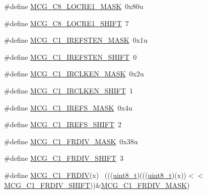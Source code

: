 \begin{DoxyCompactItemize}
\item 
\#define \hyperlink{group___m_c_g___register___masks_gad7fe66acc8b6391ccfe2c53b61a9b119}{M\+C\+G\+\_\+\+C8\+\_\+\+L\+O\+C\+R\+E1\+\_\+\+M\+A\+SK}~0x80u
\item 
\#define \hyperlink{group___m_c_g___register___masks_gad97e280f47539832dda56a845055c921}{M\+C\+G\+\_\+\+C8\+\_\+\+L\+O\+C\+R\+E1\+\_\+\+S\+H\+I\+FT}~7
\item 
\#define \hyperlink{group___m_c_g___register___masks_ga275f9145f8c55ff4c836cbd20ab06139}{M\+C\+G\+\_\+\+C1\+\_\+\+I\+R\+E\+F\+S\+T\+E\+N\+\_\+\+M\+A\+SK}~0x1u
\item 
\#define \hyperlink{group___m_c_g___register___masks_ga10e0a80bfe715350aba6d5f5212617bc}{M\+C\+G\+\_\+\+C1\+\_\+\+I\+R\+E\+F\+S\+T\+E\+N\+\_\+\+S\+H\+I\+FT}~0
\item 
\#define \hyperlink{group___m_c_g___register___masks_ga50398d9dc80a3016fddc6a2aef3df994}{M\+C\+G\+\_\+\+C1\+\_\+\+I\+R\+C\+L\+K\+E\+N\+\_\+\+M\+A\+SK}~0x2u
\item 
\#define \hyperlink{group___m_c_g___register___masks_ga2c4305645e7c2b3977dcd0d35c7eaab9}{M\+C\+G\+\_\+\+C1\+\_\+\+I\+R\+C\+L\+K\+E\+N\+\_\+\+S\+H\+I\+FT}~1
\item 
\#define \hyperlink{group___m_c_g___register___masks_gadc14970d17e8ee736a16805a412a87fe}{M\+C\+G\+\_\+\+C1\+\_\+\+I\+R\+E\+F\+S\+\_\+\+M\+A\+SK}~0x4u
\item 
\#define \hyperlink{group___m_c_g___register___masks_gada376a938782b95d20788418a2564476}{M\+C\+G\+\_\+\+C1\+\_\+\+I\+R\+E\+F\+S\+\_\+\+S\+H\+I\+FT}~2
\item 
\#define \hyperlink{group___m_c_g___register___masks_gac7762b84f41121882f4d1fbcaa839aeb}{M\+C\+G\+\_\+\+C1\+\_\+\+F\+R\+D\+I\+V\+\_\+\+M\+A\+SK}~0x38u
\item 
\#define \hyperlink{group___m_c_g___register___masks_gaee124d0ce81f6e815dbbcac62440708b}{M\+C\+G\+\_\+\+C1\+\_\+\+F\+R\+D\+I\+V\+\_\+\+S\+H\+I\+FT}~3
\item 
\#define \hyperlink{group___m_c_g___register___masks_gae985172a227b87028daa388a2d8f5c93}{M\+C\+G\+\_\+\+C1\+\_\+\+F\+R\+D\+IV}(x)                                                ~(((\hyperlink{_p_e___types_8h_aba7bc1797add20fe3efdf37ced1182c5}{uint8\+\_\+t})(((\hyperlink{_p_e___types_8h_aba7bc1797add20fe3efdf37ced1182c5}{uint8\+\_\+t})(x))$<$$<$\hyperlink{group___m_c_g___register___masks_gaee124d0ce81f6e815dbbcac62440708b}{M\+C\+G\+\_\+\+C1\+\_\+\+F\+R\+D\+I\+V\+\_\+\+S\+H\+I\+FT}))\&\hyperlink{group___m_c_g___register___masks_gac7762b84f41121882f4d1fbcaa839aeb}{M\+C\+G\+\_\+\+C1\+\_\+\+F\+R\+D\+I\+V\+\_\+\+M\+A\+SK})
$$
\end{DoxyCompactItemize}
